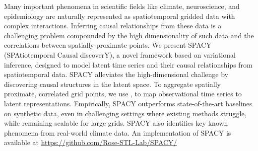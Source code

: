 
Many important phenomena in scientific fields like climate, neuroscience, and epidemiology are naturally represented as spatiotemporal gridded data with complex interactions.  Inferring causal relationships from these data is a challenging problem compounded by the high dimensionality of such data and the correlations between spatially proximate points. We present SPACY (SPAtiotemporal Causal discoverY), a novel framework based on variational inference, designed to model latent time series and their causal relationships from spatiotemporal data. SPACY alleviates the high-dimensional challenge by discovering causal structures in the latent space. To aggregate spatially proximate, correlated grid points, we use , to map observational time series to latent representations.  Empirically, SPACY outperforms state-of-the-art baselines on synthetic data, even in challenging settings where existing methods struggle, while remaining scalable for large grids. SPACY also identifies key known phenomena from real-world climate data. An implementation of SPACY is available at \url{https://github.com/Rose-STL-Lab/SPACY/}

